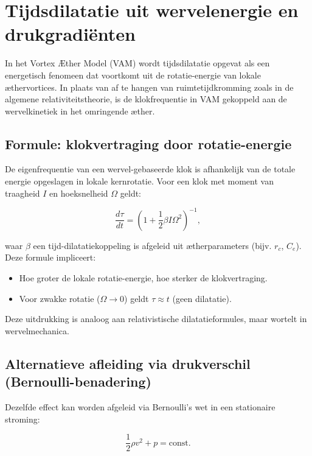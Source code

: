 
\section{Tijdsdilatatie uit wervelenergie en drukgradiënten}

In het Vortex Æther Model (VAM) wordt tijdsdilatatie opgevat als een energetisch fenomeen dat voortkomt uit de rotatie-energie van lokale æthervortices. In plaats van af te hangen van ruimtetijdkromming zoals in de algemene relativiteitstheorie, is de klokfrequentie in VAM gekoppeld aan de wervelkinetiek in het omringende æther.

\subsection{Formule: klokvertraging door rotatie-energie}

De eigenfrequentie van een wervel-gebaseerde klok is afhankelijk van de totale energie opgeslagen in lokale kernrotatie. Voor een klok met moment van traagheid $I$ en hoeksnelheid $\Omega$ geldt:

\begin{equation}
\frac{d\tau}{dt} = \left(1 + \frac{1}{2} \beta I \Omega^2 \right)^{-1},
\end{equation}

waar $\beta$ een tijd-dilatatiekoppeling is afgeleid uit ætherparameters (bijv. $r_c$, $C_e$). Deze formule impliceert:

\begin{itemize}
    \item Hoe groter de lokale rotatie-energie, hoe sterker de klokvertraging.
    \item Voor zwakke rotatie ($\Omega \to 0$) geldt $\tau \approx t$ (geen dilatatie).
\end{itemize}

Deze uitdrukking is analoog aan relativistische dilatatieformules, maar wortelt in wervelmechanica.

\subsection{Alternatieve afleiding via drukverschil (Bernoulli-benadering)}

Dezelfde effect kan worden afgeleid via Bernoulli’s wet in een stationaire stroming:

\begin{equation}
\frac{1}{2} \rho v^2 + p = \text{const.}
\end{equation}

